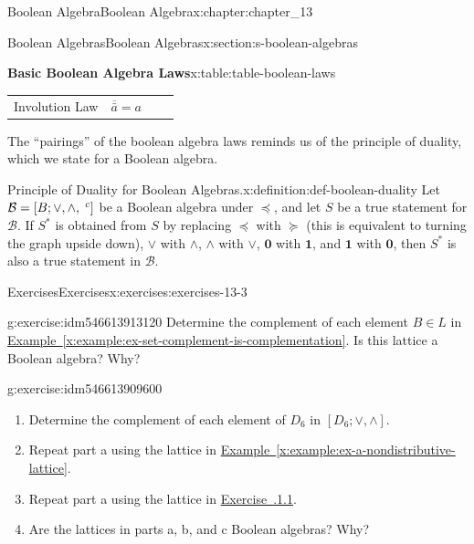 \documentclass[oneside,10pt,]{book}
\newcommand{\xreffont}{\relax}
\numberwithin{equation}{section}
\begin{document}
\begin{chapterptx}{Boolean Algebra}{}{Boolean Algebra}{}{}{x:chapter:chapter_13}
\begin{sectionptx}{Boolean Algebras}{}{Boolean Algebras}{}{}{x:section:s-boolean-algebras}
\begin{tableptx}{\textbf{Basic Boolean Algebra Laws}}{x:table:table-boolean-laws}{}
{\begin{tabular}{lll}
Involution Law&\(\overline{\bar{a}} = a\)&\(\quad\)
\end{tabular}
}%
\end{tableptx}%
The ``pairings'' of the boolean algebra laws reminds us of the principle of duality, which we state for a Boolean algebra.%
\begin{definition}{Principle of Duality for Boolean Algebras.}{x:definition:def-boolean-duality}%
%
\label{g:notation:idm546613922880}%
Let \(\mathcal{B}=[B; \lor, \land, \hspace{1 mm}^c]\) be a Boolean algebra under  \(\preceq\), and let \(S\) be a true statement for  \(\mathcal{B}\). If  \(S^*\) is obtained from \(S\) by replacing  \(\preceq\) with \(\succeq\) (this is equivalent to turning the graph upside down),  \(\lor\) with  \(\land\), \(\land\)  with  \(\lor\), \(\pmb{0}\) with \(\pmb{1}\), and \(\pmb{1}\) with \(\pmb{0}\), then \(S^*\) is also a true statement in  \(\mathcal{B}\).%
\end{definition}
%
%
\typeout{************************************************}
\typeout{************************************************}
%
\begin{exercises-subsection}{Exercises}{}{Exercises}{}{}{x:exercises:exercises-13-3}
\begin{divisionexercise}{1}{}{}{g:exercise:idm546613913120}%
Determine the complement of each element \(B \in  L\) in \hyperref[x:example:ex-set-complement-is-complementation]{Example~{\xreffont\ref{x:example:ex-set-complement-is-complementation}}}. Is this lattice a Boolean algebra? Why?%
\end{divisionexercise}%
\begin{divisionexercise}{2}{}{}{g:exercise:idm546613909600}%
%
\begin{enumerate}[label=(\alph*)]
\item{}Determine the complement of each element of \(D_6\) in \(\left[D_6; \lor , \land \right]\).%
\item{}Repeat part a using the lattice in \hyperref[x:example:ex-a-nondistributive-lattice]{Example~{\xreffont\ref{x:example:ex-a-nondistributive-lattice}}}.%
\item{}Repeat part a using the lattice in \hyperlink{x:exercise:exercise-13-1-1}{Exercise~{\xreffont 13.1.1.1}}.%
\item{}Are the lattices in parts a, b, and c Boolean algebras? Why?%
\end{enumerate}
%
\end{divisionexercise}%

\end{exercises-subsection}
\end{sectionptx}
\end{chapterptx}
\end{document}
